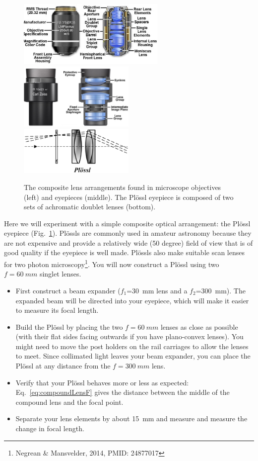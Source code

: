 \documentclass[a4paper]{report}
\begin{document}
\begin{figure}[h]
\center
\includegraphics[width=2.8in]{objectivesfigure1.eps}
\includegraphics[width=2.2in]{eyepieces5.eps}
\includegraphics[width=2.2in]{Plossl.eps}
\caption{The composite lens arrangements found in microscope
  objectives (left) and eyepieces (middle).
  The Pl\"{o}ssl eyepiece is composed of two sets of achromatic doublet lenses (bottom).}
\label{fig:composite}
\end{figure}


Here we will experiment with a simple composite optical arrangement: the Pl\"{o}ssl eyepiece (Fig.~\ref{fig:composite}). 
Pl\"{o}ssls are commonly used in amateur astronomy because they are not expensive and provide a relatively wide (50 degree) field of view that is of good 
quality if the eyepiece is well made. 
Pl\"{o}ssls also make suitable scan lenses for two photon microscopy\footnote{Negrean \& Mansvelder, 2014, PMID: 24877017}.
You will now construct a Pl\"{o}ssl using two $f=60~mm$ singlet lenses.


\begin{itemize}
\item First construct a beam expander ($f_1$=30~mm lens and a $f_2$=300~mm). 
The expanded beam will be directed into your eyepiece, which will make it easier to measure its focal length.
\item Build the Pl\"ossl by placing the two $f=60~mm$ lenses as close as possible (with their flat sides facing outwards if you have plano-convex lenses). 
You might need to move the post holders on the rail carriages to allow the lenses to meet.
Since collimated light leaves your beam expander, you can place the Pl\"ossl at any distance from the $f=300~mm$ lens. 
\item Verify that your Pl\"{o}ssl behaves more or less as expected: 
Eq.~\ref{eq:compoundLensF} gives the distance between the middle of the compound lens and the focal point. 
\item Separate your lens elements by about 15~mm and measure and measure the change in focal length.
\end{itemize}
\end{document}
